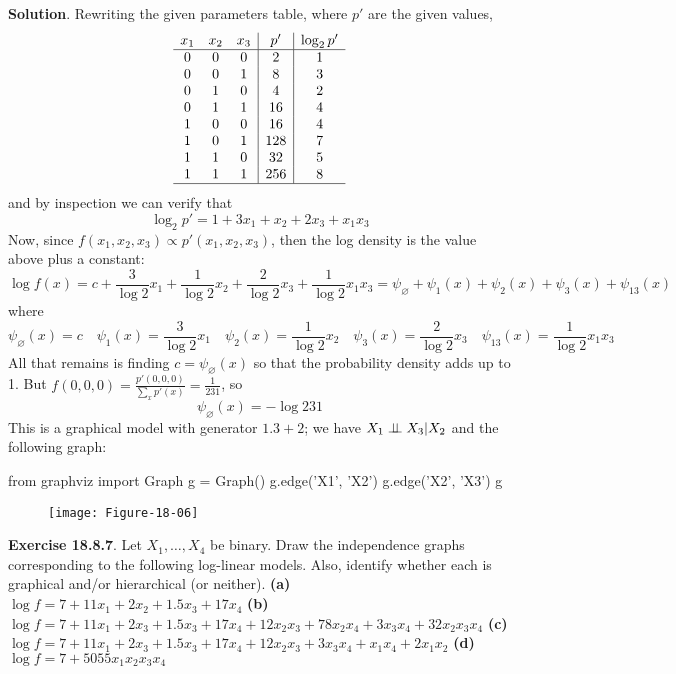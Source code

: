 \textbf{Solution}. Rewriting the given parameters table, where \(p'\)
are the given values,
\[
\begin{array}{ccc | c | c}
x_{1} & x_{2} & x_{3} & p'   & \log_{2} p'\\
\hline
0   &   0  &  0 & 2   & 1\\
0   &   0  &  1 & 8   & 3\\
0   &   1  &  0 & 4   & 2\\
0   &   1  &  1 & 16  & 4\\
1   &   0  &  0 & 16  & 4\\
1   &   0  &  1 & 128 & 7\\
1   &   1  &  0 & 32  & 5\\
1   &   1  &  1 & 256 & 8\\
\hline
\end{array}
\]
and by inspection we can verify that
\[
\log_{2} p' = 1 + 3 x_{1} + x_{2} + 2 x_{3} + x_{1} x_{3}
\]
Now, since \(f(x_{1}, x_{2}, x_{3}) \propto p'(x_{1}, x_{2}, x_{3})\), then the log
density is the value above plus a constant:
\[
\log f(x) = c + \frac{3}{\log 2} x_{1} + \frac{1}{\log 2} x_{2} + \frac{2}{\log 2} x_{3} + \frac{1}{\log 2} x_{1} x_{3}  = \psi_\varnothing + \psi_{1}(x) + \psi_{2}(x) + \psi_{3}(x) + \psi_{13}(x)
\]
where
\[
\psi_\varnothing(x) = c
\quad
\psi_{1}(x) = \frac{3}{\log 2} x_{1}
\quad
\psi_{2}(x) = \frac{1}{\log 2} x_{2}
\quad
\psi_{3}(x) = \frac{2}{\log 2} x_{3}
\quad
\psi_{13}(x) = \frac{1}{\log 2} x_{1} x_{3}
\]
All that remains is finding \(c = \psi_\varnothing(x)\) so that the
probability density adds up to 1. But
\(f(0, 0, 0) = \frac{p'(0, 0, 0)}{\sum_x p'(x)} = \frac{1}{231}\), so
\[
\psi_\varnothing(x) = - \log 231
\]
This is a graphical model with generator \(1.3 + 2\); we have
\(X_{1} \perp\!\!\!\perp X_{3} | X_{2}\) and the following graph:

\begin{python}
from graphviz import Graph
g = Graph()
g.edge('X1', 'X2')
g.edge('X2', 'X3')
g
\end{python}

\begin{figure}[H]
\centering
\texttt{[image: Figure-18-06]}
\end{figure}


\textbf{Exercise 18.8.7}. Let \(X_{1}, \dots, X_{4}\) be binary. Draw the
independence graphs corresponding to the following log-linear models.
Also, identify whether each is graphical and/or hierarchical (or
neither).
\textbf{(a)} \(\log f = 7 + 11 x_{1} + 2 x_{2} + 1.5 x_{3} + 17 x_{4}\)
\textbf{(b)}
\(\log f = 7 + 11 x_{1} + 2 x_{3} + 1.5 x_{3} + 17 x_{4} + 12 x_{2} x_{3} + 78 x_{2} x_{4} + 3 x_{3} x_{4} + 32 x_{2} x_{3} x_{4}\)
\textbf{(c)}
\(\log f = 7 + 11 x_{1} + 2 x_{3} + 1.5 x_{3} + 17 x_{4} + 12 x_{2} x_{3} + 3 x_{3} x_{4} + x_{1} x_{4} + 2 x_{1} x_{2}\)
\textbf{(d)} \(\log f = 7 + 5055 x_{1} x_{2} x_{3} x_{4}\)

